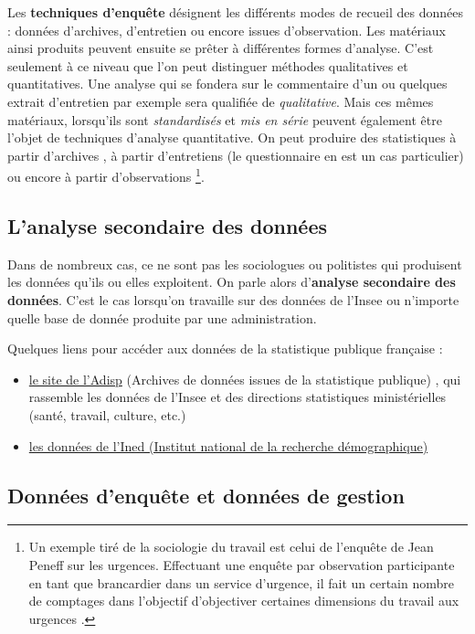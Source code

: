 \documentclass[
]{book}
\begin{document}
Les \textbf{techniques d'enquête} désignent les différents modes de recueil des données : données d'archives, d'entretien ou encore issues d'observation. Les matériaux ainsi produits peuvent ensuite se prêter à différentes formes d'analyse. C'est seulement à ce niveau que l'on peut distinguer méthodes qualitatives et quantitatives. Une analyse qui se fondera sur le commentaire d'un ou quelques extrait d'entretien par exemple sera qualifiée de \emph{qualitative}. Mais ces mêmes matériaux, lorsqu'ils sont \emph{standardisés} et \emph{mis en série} peuvent également être l'objet de techniques d'analyse quantitative. On peut produire des statistiques à partir d'archives \citep{lemercier2008}, à partir d'entretiens (le questionnaire en est un cas particulier) ou encore à partir d'observations \footnote{Un exemple tiré de la sociologie du travail est celui de l'enquête de Jean Peneff sur les urgences. Effectuant une enquête par observation participante en tant que brancardier dans un service d'urgence, il fait un certain nombre de comptages dans l'objectif d'objectiver certaines dimensions du travail aux urgences \citep{peneff1992}.}.

\hypertarget{lanalyse-secondaire-des-donnuxe9es}{%
\subsection{L'analyse secondaire des données}\label{lanalyse-secondaire-des-donnuxe9es}}

Dans de nombreux cas, ce ne sont pas les sociologues ou politistes qui produisent les données qu'ils ou elles exploitent. On parle alors d'\textbf{analyse secondaire des données}. C'est le cas lorsqu'on travaille sur des données de l'Insee ou n'importe quelle base de donnée produite par une administration.

Quelques liens pour accéder aux données de la statistique publique française :

\begin{itemize}
\item
  \href{http://www.progedo-adisp.fr/}{le site de l'Adisp} (Archives de données issues de la statistique publique) , qui rassemble les données de l'Insee et des directions statistiques ministérielles (santé, travail, culture, etc.)
\item
  \href{http://nesstar.ined.fr/webview/}{les données de l'Ined (Institut national de la recherche démographique)}
\end{itemize}

\hypertarget{donnuxe9es-denquuxeate-et-donnuxe9es-de-gestion}{%
\subsection{Données d'enquête et données de gestion}\label{donnuxe9es-denquuxeate-et-donnuxe9es-de-gestion}}
\end{document}

